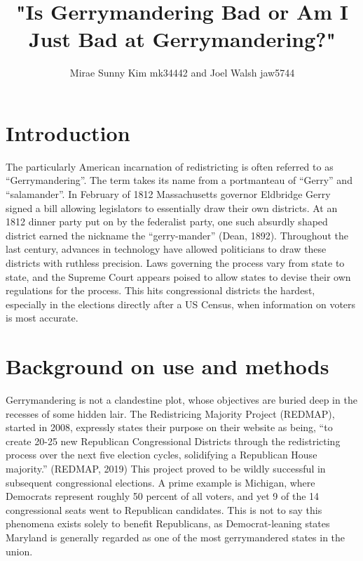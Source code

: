\documentclass{article}
\begin{document}
\title{"Is Gerrymandering Bad or Am I Just Bad at Gerrymandering?"}
\author{Mirae Sunny Kim mk34442 and Joel Walsh jaw5744}
\maketitle

\section{Introduction}
	\hspace{\parindent}
 The particularly American incarnation of redistricting is often referred to as “Gerrymandering”. The term takes its name from a portmanteau of “Gerry” and “salamander”. In February of 1812 Massachusetts governor Eldbridge Gerry signed a bill allowing legislators to essentially draw their own districts. At an 1812 dinner party put on by the federalist party, one such absurdly shaped district earned the nickname the “gerry-mander” (Dean, 1892). Throughout the last century, advances in technology have allowed politicians to draw these districts with ruthless precision. Laws governing the process vary from state to state, and the Supreme Court appears poised to allow states to devise their own regulations for the process. This hits congressional districts the hardest, especially in the elections directly after a US Census, when information on voters is most accurate. 


\section{Background on use and methods}
\hspace{\parindent}
Gerrymandering is not a clandestine plot, whose objectives are buried deep in the recesses of some hidden lair. The Redistricing Majority Project (REDMAP), started in 2008, expressly states their purpose  on their website as being, “to create 20-25 new Republican Congressional Districts through the redistricting process over the next five election cycles, solidifying a Republican House majority.” (REDMAP, 2019) This project proved to be wildly successful in subsequent congressional elections. A prime example is Michigan, where Democrats represent roughly 50 percent of all voters, and yet 9 of the 14 congressional seats went to Republican candidates. This is not to say this phenomena exists solely to benefit Republicans, as Democrat-leaning states Maryland is generally regarded as one of the most gerrymandered states in the union.
\end{document}
